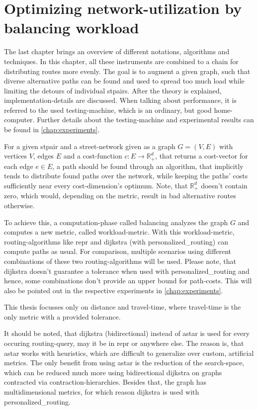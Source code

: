 \chapter{Optimizing network-utilization by balancing workload}
\label{chap:balancing}

The last chapter brings an overview of different notations, algorithms and techniques.
In this chapter, all these instruments are combined to a chain for distributing routes more evenly.
The goal is to augment a given graph, such that diverse alternative paths can be found and used to spread too much load while limiting the detours of individual \glspl{stpair}.
After the theory is explained, implementation-details are discussed.
When talking about performance, it is referred to the used testing-machine, which is an ordinary, but good home-computer.
Further details about the testing-machine and experimental results can be found in \vref{chap:experiments}.

For a given \gls{stpair} and a street-network given as a graph $G = (V, E)$ with vertices $V$, edges $E$ and a cost-function $c: E \to \mathbb{R}_+^d$, that returns a cost-vector for each edge $e \in E$, a path should be found through an algorithm, that implicitly tends to distribute found paths over the network, while keeping the paths' \glspl{cost} sufficiently near every \gls{cost}-dimension's optimum.
Note, that $\mathbb{R}_+^d$ doesn't contain zero, which would, depending on the \gls{metric}, result in bad alternative routes otherwise.

To achieve this, a computation-phase called \gls{balancing} analyzes the graph $G$ and computes a new \gls{metric}, called workload-\gls{metric}.
With this workload-\gls{metric}, routing-algorithms like \gls{repr} and \gls{dijkstra} (with \gls{personalized_routing}) can compute paths as usual.
For comparison, multiple scenarios using different combinations of these two routing-algorithms will be used.
Please note, that \gls{dijkstra} doesn't guarantee a tolerance when used with \gls{personalized_routing} and hence, some combinations don't provide an upper bound for path-costs.
This will also be pointed out in the respective experiments in \cref{chap:experiments}.

This thesis focusses only on distance and travel-time, where travel-time is the only \gls{metric} with a provided tolerance.

It should be noted, that \gls{dijkstra} (bidirectional) instead of \gls{astar} is used for every occuring routing-query, may it be in \gls{repr} or anywhere else.
The reason is, that \gls{astar} works with heuristics, which are difficult to generalize over custom, artificial \glspl{metric}.
The only benefit from using \gls{astar} is the reduction of the search-space, which can be reduced much more using bidirectional \gls{dijkstra} on graphs contracted via \gls{contraction-hierarchies}.
Besides that, the graph has multidimensional \glspl{metric}, for which reason \gls{dijkstra} is used with \gls{personalized_routing}.

